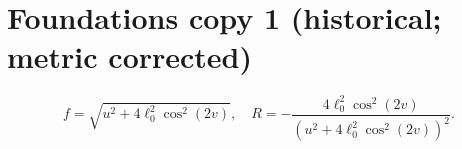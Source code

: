 \documentclass[11pt]{article}
\begin{document}
\section*{Foundations copy 1 (historical; metric corrected)}
\[
f=\sqrt{u^2+4\ell_0^2\cos^2(2v)},\quad
R=-\frac{4\ell_0^2\cos^2(2v)}{(u^2+4\ell_0^2\cos^2(2v))^2}.
\]
\end{document}
